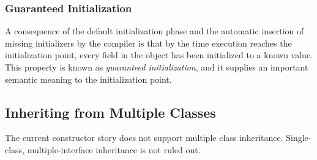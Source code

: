 \subsubsection{Guaranteed Initialization}
\label{Guaranteed_Initialization}

A consequence of the default initialization phase and the automatic insertion of
missing initializers by the compiler is that by the time execution reaches the
initialization point, every field in the object has been initialized to a known
value.  This property is known as \emph{guaranteed initialization}, and it supplies an
important semantic meaning to the initialization point.

\subsection{Inheriting from Multiple Classes}
\label{Inheriting_from_Multiple_Classes}

The current constructor story does not support multiple class inheritance.
Single-class, multiple-interface inheritance is not ruled out.


